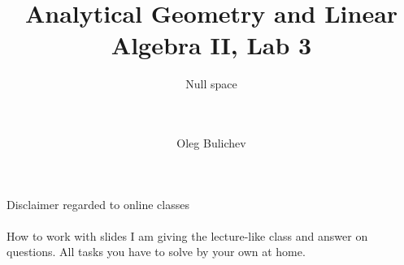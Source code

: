 \documentclass[aspectratio=169]{beamer}
\title[AGLA2]{Analytical Geometry and Linear Algebra II, Lab 3} %
\subtitle{Null space \\ \ \\ \ 
         } %
\author{Oleg Bulichev}
\newcommand{\fbckg}[1]{\usebackgroundtemplate{\texttt{[image: \#1]}}}%
\begin{document}
\fbckg{fibeamer/figs/title_page.png}

\fbckg{fibeamer/figs/common.png}



\begin{frame}[c]{Disclaimer regarded to online classes}
    \framesubtitle{}

    \Large
    \begin{block}{How to work with slides}
        \centering I am giving the lecture-like class and answer on questions. All tasks you have to solve by your own at home.
    \end{block}

\end{frame}
\end{document}
